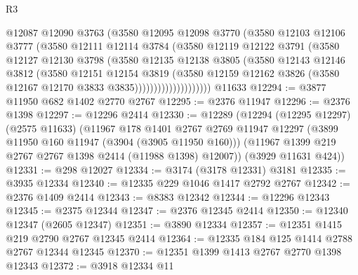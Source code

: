 \begin{lexlean}{R3}
\begin{coremodule}
                        @12087
                        @12090
                        @3763
                        (@3580
                          @12095
                          @12098
                          @3770
                          (@3580
                            @12103
                            @12106
                            @3777
                            (@3580
                              @12111
                              @12114
                              @3784
                              (@3580
                                @12119
                                @12122
                                @3791
                                (@3580
                                  @12127
                                  @12130
                                  @3798
                                  (@3580
                                    @12135
                                    @12138
                                    @3805
                                    (@3580
                                      @12143
                                      @12146
                                      @3812
                                      (@3580
                                        @12151
                                        @12154
                                        @3819
                                        (@3580
                                          @12159
                                          @12162
                                          @3826
                                          (@3580 @12167 @12170 @3833 @3835))))))))))))))))))))
    @11633
@12294 := @3877 @11950 @682 @1402 @2770 @2767
@12295 := @2376 @11947
@12296 := @2376 @1398
@12297 := @12296 @2414
@12330 := @12289
    (@12294
      (@12295 @12297)
      (@2575 @11633)
      (@11967
        @178
        @1401
        @2767
        @2769
        @11947
        @12297
        (@3899 @11950 @160 @11947 (@3904 (@3905 @11950 @160)))
        (@11967 @1399 @219 @2767 @2767 @1398 @2414 (@11988 @1398) @12007))
      (@3929 @11631 @424))
@12331 := @298 @12027
@12334 := @3174 (@3178 @12331) @3181
@12335 := @3935 @12334
@12340 := @12335 @229 @1046 @1417 @2792 @2767
@12342 := @2376 @1409 @2414
@12343 := @8383 @12342
@12344 := @12296 @12343
@12345 := @2375 @12344
@12347 := @2376 @12345 @2414
@12350 := @12340 @12347 (@2605 @12347)
@12351 := @3890 @12334
@12357 := @12351 @1415 @219 @2790 @2767 @12345 @2414
@12364 := @12335 @184 @125 @1414 @2788 @2767 @12344 @12345
@12370 := @12351 @1399 @1413 @2767 @2770 @1398 @12343
@12372 := @3918 @12334 @11

\end{coremodule}
\end{lexlean}
